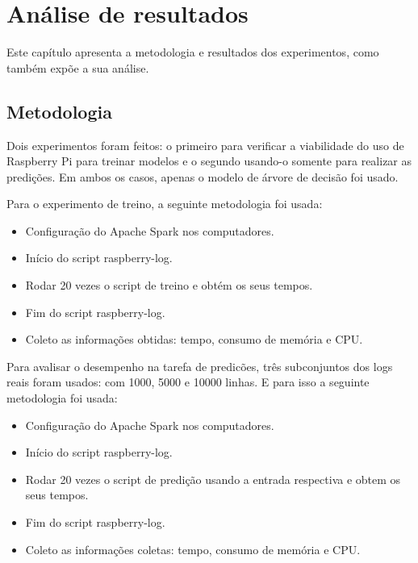 
\chapter{Análise de resultados}
\label{cap:results}

Este capítulo apresenta a metodologia e resultados dos experimentos, como também 
expõe a sua análise.

\section{Metodologia}

Dois experimentos foram feitos: o primeiro para verificar a viabilidade do uso 
de Raspberry Pi para treinar modelos e o segundo usando-o somente para realizar as
predições. Em ambos os casos, apenas o modelo de árvore de decisão foi usado.

Para o experimento de treino, a seguinte metodologia foi usada:

\begin{itemize}
    \item Configuração do Apache Spark nos computadores.
    \item Início do script raspberry-log. 
    \item Rodar 20 vezes o script de treino e obtém os seus tempos.
    \item Fim do script raspberry-log. 
    \item Coleto as informações obtidas: tempo, consumo de memória e CPU.
\end{itemize}

Para avalisar o desempenho na tarefa de predicões, três subconjuntos
dos logs reais foram usados: com 1000, 5000 e 10000 linhas. E para isso a seguinte 
metodologia foi usada: 

\begin{itemize}
    \item Configuração do Apache Spark nos computadores.
    \item Início do script raspberry-log. 
    \item Rodar 20 vezes o script de predição usando a entrada respectiva e obtem os seus tempos.
    \item Fim do script raspberry-log. 
    \item Coleto as informações coletas: tempo, consumo de memória e CPU.
\end{itemize}

